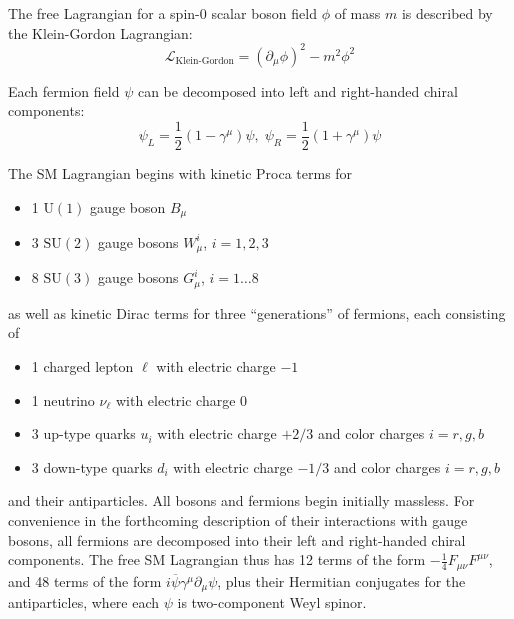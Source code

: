 The free Lagrangian for a spin-0 scalar boson field $\phi$ of mass $m$ is described by the Klein-Gordon Lagrangian:
\begin{equation}
  \mathcal{L}_\text{Klein-Gordon} = (\partial_\mu\phi)^2 - m^2 \phi^2
  \label{eq:sm:kg}
\end{equation}

Each fermion field $\psi$ can be decomposed into left and right-handed chiral components:
\begin{equation}
  \psi_L = \frac12\left(1-\gamma^\mu\right)\psi,\;\psi_R = \frac12\left(1+\gamma^\mu\right)\psi
  \label{eq:sm:chiral}
\end{equation}

The SM Lagrangian begins with kinetic Proca terms for
\begin{itemize}
  \item 1 $\mathrm{U}(1)$ gauge boson $B_\mu$
  \item 3 $\mathrm{SU}(2)$ gauge bosons $W_\mu^i$, $i = 1, 2, 3$
  \item 8 $\mathrm{SU}(3)$ gauge bosons $G_\mu^i$, $i = 1 \ldots 8$
\end{itemize}
as well as kinetic Dirac terms for three ``generations'' of fermions, each consisting of
\begin{itemize}
  \item 1 charged lepton $\ell$ with electric charge $-1$
  \item 1 neutrino $\nu_\ell$ with electric charge 0
  \item 3 up-type quarks $u_i$ with electric charge $+2/3$ and color charges $i = r, g, b$
  \item 3 down-type quarks $d_i$ with electric charge $-1/3$ and color charges $i = r, g, b$
\end{itemize}
and their antiparticles.
All bosons and fermions begin initially massless.
For convenience in the forthcoming description of their interactions with gauge bosons, all fermions are decomposed into their left and right-handed chiral components.
The free SM Lagrangian thus has 12 terms of the form $-\frac14 F_{\mu\nu}F^{\mu\nu}$, and 48 terms of the form $i\overline{\psi}\gamma^\mu\partial_\mu\psi$, plus their Hermitian conjugates for the antiparticles, where each $\psi$ is two-component Weyl spinor.

